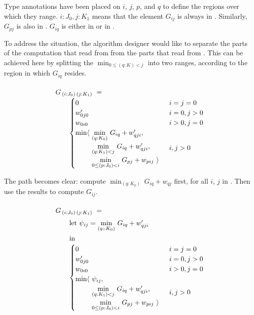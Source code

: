 \medskip
Type annotations have been placed on $i$, $j$, $p$, and $q$ to define the regions
over which they range. $i:J_0, j:K_1$ means that the element $G_{ij}$
is always in . Similarly, $G_{pj}$ is also in . $G_{iq}$ is either in
 or in .


To address the situation, the algorithm designer would like to separate the parts
of the computation that read from  from the parts that read from .
This can be achieved here by splitting the $\min_{0\leq(q:K)<j}$ into two
ranges, according to the region in which $G_{iq}$ resides.

\begin{equation}\LeftEqNo
\renewcommand\arraystretch{1.5}
\begin{array}{l@{}l}
	G_{\,(i : J_0)\,(j : K_1)} ~=~  \\
	\qquad
	\begin{cases}
		0                        & i=j=0 \\
		w'_{0j0}                 & i=0, j>0 \\
		w_{0i0}                  & i>0, j=0 \\
		\begin{array}{@{}l@{~}l}
		  \min\langle & \underset{(q:K_0)}\min ~ G_{iq} + w'_{qji}, \\
		              & \underset{(q:K_1) <j}\min ~ G_{iq} + w'_{qji}, \\
		              & \underset{0\leq (p:J_0) <i}\min ~ G_{pj} + w_{pij}~\rangle
		\end{array}              & i,j>0
	\end{cases}
\end{array}
\end{equation}

\medskip
The path becomes clear: compute $\min_{(q:K_0)} ~ G_{iq} + w_{qj}$ first, for all $i$, $j$
in . Then use the results to compute $G_{ij}$.

\begin{equation}\LeftEqNo
\renewcommand\arraystretch{1.5}
\begin{array}{l@{}l}
	G_{\,(i : J_0)\,(j : K_1)} ~=~  \\
	\qquad
	\textrm{let}~\psi_{ij} = \underset{(q::K_0)}\min ~ G_{iq} + w'_{qji} \\
	\qquad\textrm{in} \\
	\qquad
	\begin{cases}
		0                        & i=j=0 \\
		w'_{0j0}                 & i=0, j>0 \\
		w_{0i0}                  & i>0, j=0 \\
		\begin{array}{@{}l@{~}l}
		  \min\langle & \psi_{ij}, \\
		              & \underset{(q:K_1) <j}\min ~ G_{iq} + w'_{qji}, \\
		              & \underset{0\leq (p:J_0) <i}\min ~ G_{pj} + w_{pij}~\rangle
		\end{array}              & i,j>0
	\end{cases}
\end{array}
\label{intro:let in 2}
\end{equation}

